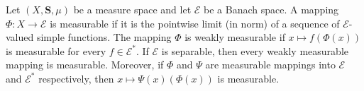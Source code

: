 Let $(X, \mathbf{S}, \mu)$ be a measure space and let $\mathcal{E}$ be a Banach space. A mapping $\Phi: X \to \mathcal{E}$ is measurable if it is the pointwise limit (in norm) of a sequence of $\mathcal{E}$-valued simple functions. The mapping $\Phi$ is weakly measurable if $x \mapsto f(\Phi(x))$ is measurable for every $f \in \mathcal{E}^*$. If $\mathcal{E}$ is separable, then every weakly measurable mapping is measurable. Moreover, if $\Phi$ and $\Psi$ are measurable mappings into $\mathcal{E}$ and $\mathcal{E}^*$ respectively, then $x \mapsto \Psi(x)(\Phi(x))$ is measurable.
